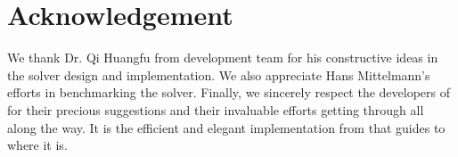 \section{Acknowledgement}

We thank Dr. Qi Huangfu from  development team for his
constructive ideas in the solver design and implementation. We also appreciate
Hans Mittelmann's efforts in benchmarking the solver. Finally, we sincerely
respect the developers of  for their precious suggestions
{\cite{benson2008algorithm}} and their invaluable efforts getting
 through all along the way. It is the efficient and elegant
implementation from  that guides  to
where it is.
